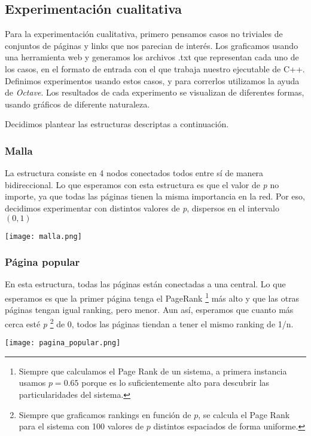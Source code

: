 \subsection{Experimentación cualitativa}
Para la experimentación cualitativa, primero pensamos casos no triviales de conjuntos de
páginas y links que nos parecian de interés.
Los graficamos usando una herramienta web y generamos los archivos .txt que representan cada 
uno de los casos, en el formato de entrada con el que trabaja nuestro ejecutable de C++.
Definimos experimentos usando estos casos, y para correrlos utilizamos la ayuda de \textit{Octave}.
Los resultados de cada experimento se visualizan de diferentes formas, usando gráficos de diferente
naturaleza.

Decidimos plantear las estructuras descriptas a continuación.

\subsubsection{Malla}
La estructura consiste en 4 nodos conectados todos entre sí de manera bidireccional.
Lo que esperamos con esta estructura es que el valor de \textit{p} no importe, ya que todas las páginas tienen la misma importancia en la red. Por eso, decidimos experimentar con distintos valores de \textit{p}, dispersos en el intervalo $(0, 1)$

\begin{center}
\texttt{[image: malla.png]}
\end{center}


\subsubsection{Página popular}
En esta estructura, todas las páginas están conectadas a una central.
Lo que esperamos es que la primer página tenga el PageRank \footnote{Siempre que calculamos el Page Rank de un sistema, a primera instancia
usamos $p = 0.65$ porque es lo suficientemente alto para descubrir las particularidades del sistema.} más alto  y que las otras páginas tengan igual ranking, pero menor. 
Aun así, esperamos que cuanto más cerca esté \textit{p} \footnote{Siempre
que graficamos rankings en función de $p$, se calcula el Page Rank para el sistema con 100 valores de $p$ distintos
espaciados de forma uniforme.} de 0, todos las páginas tiendan a tener el mismo ranking de 1/n.

\begin{center}
\texttt{[image: pagina\_popular.png]}
\end{center}


